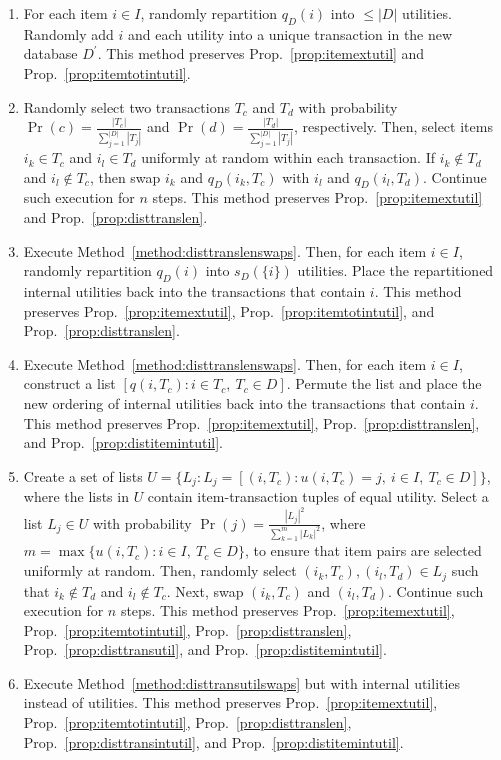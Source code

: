 \documentclass{article}
\begin{document}
\begin{enumerate}
    \item For each item $i \in I$, randomly repartition $q_D(i)$ into $\leq
        |D|$ utilities. Randomly add $i$ and each utility into a unique
        transaction in the new database $D^\prime$. This method preserves
        Prop.~\ref{prop:itemextutil} and Prop.~\ref{prop:itemtotintutil}.
    \item\label{method:disttranslenswaps} Randomly select two transactions
        $T_c$ and $T_d$ with probability $\Pr(c) = \frac{|T_c|}{\sum_{j =
        1}^{|D|} |T_j|}$ and $\Pr(d) = \frac{|T_d|}{\sum_{j = 1}^{|D|} |T_j|}$,
        respectively. Then, select items $i_k \in T_c$ and $i_l \in T_d$
        uniformly at random within each transaction. If $i_k \notin T_d$ and
        $i_l \notin T_c$, then swap $i_k$ and $q_D(i_k, T_c)$ with $i_l$ and
        $q_D(i_l, T_d)$. Continue such execution for $n$ steps. This method
        preserves Prop.~\ref{prop:itemextutil} and
        Prop.~\ref{prop:disttranslen}.
    \item Execute Method~\ref{method:disttranslenswaps}. Then, for each item $i
        \in I$, randomly repartition $q_D(i)$ into $s_D(\{i\})$ utilities.
        Place the repartitioned internal utilities back into the transactions
        that contain $i$. This method preserves Prop.~\ref{prop:itemextutil},
        Prop.~\ref{prop:itemtotintutil}, and Prop.~\ref{prop:disttranslen}.
    \item Execute Method~\ref{method:disttranslenswaps}.  Then, for each item
        $i \in I$, construct a list $[q(i, T_c) : i \in T_c, \ T_c \in D]$.
        Permute the list and place the new ordering of internal utilities back
        into the transactions that contain $i$. This method preserves
        Prop.~\ref{prop:itemextutil}, Prop.~\ref{prop:disttranslen}, and
        Prop.~\ref{prop:distitemintutil}.
    \item\label{method:disttransutilswaps} Create a set of lists $U = \{L_j :
        L_j = [(i, T_c) : u(i, T_c) = j, \ i \in I, \ T_c \in D]\}$, where the
        lists in $U$ contain item-transaction tuples of equal utility.  Select
        a list $L_j \in U$ with probability $\Pr(j) = \frac{{|L_j|}^2}{\sum_{k
        = 1}^m {|L_k|}^2}$, where $m = \max\{u(i, T_c) : i \in I,\  T_c \in
        D\}$, to ensure that item pairs are selected uniformly at random. Then,
        randomly select $(i_k, T_c), (i_l, T_d) \in L_j$ such that $i_k \notin
        T_d$ and $i_l \notin T_c$. Next, swap $(i_k, T_c)$ and $(i_l, T_d)$.
        Continue such execution for $n$ steps. This method preserves
        Prop.~\ref{prop:itemextutil}, Prop.~\ref{prop:itemtotintutil},
        Prop.~\ref{prop:disttranslen}, Prop.~\ref{prop:disttransutil}, and
        Prop.~\ref{prop:distitemintutil}.
    \item Execute Method~\ref{method:disttransutilswaps} but with internal
        utilities instead of utilities. This method preserves
        Prop.~\ref{prop:itemextutil}, Prop.~\ref{prop:itemtotintutil},
        Prop.~\ref{prop:disttranslen}, Prop.~\ref{prop:disttransintutil},
        and Prop.~\ref{prop:distitemintutil}.
\end{enumerate}
\end{document}
